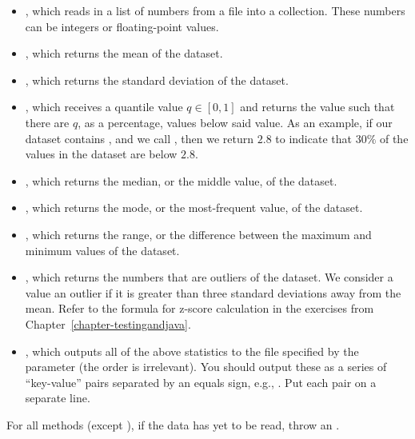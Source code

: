\begin{itemize}
    \item {}, which reads in a list of numbers from a file into a collection. These numbers can be integers or floating-point values.
    \item {}, which returns the mean of the dataset.
    \item {}, which returns the standard deviation of the dataset.
    \item {}, which receives a quantile value $q \in [0, 1]$ and returns the value such that there are $q$, as a percentage, values below said value. As an example, if our dataset contains , and we call , then we return $2.8$ to indicate that $30\%$ of the values in the dataset are below $2.8$. 
    \item {}, which returns the median, or the middle value, of the dataset.
    \item {}, which returns the mode, or the most-frequent value, of the dataset.
    \item {}, which returns the range, or the difference between the maximum and minimum values of the dataset.
    \item {}, which returns the numbers that are outliers of the dataset. We consider a value an outlier if it is greater than three standard deviations away from the mean. Refer to the formula for z-score calculation in the exercises from Chapter~\ref{chapter-testingandjava}.
    \item {}, which outputs all of the above statistics to the file specified by the parameter (the order is irrelevant). You should output these as a series of ``key-value'' pairs separated by an equals sign, e.g., . Put each pair on a separate line.
\end{itemize}

For all methods (except ), if the data has yet to be read, throw an . 


